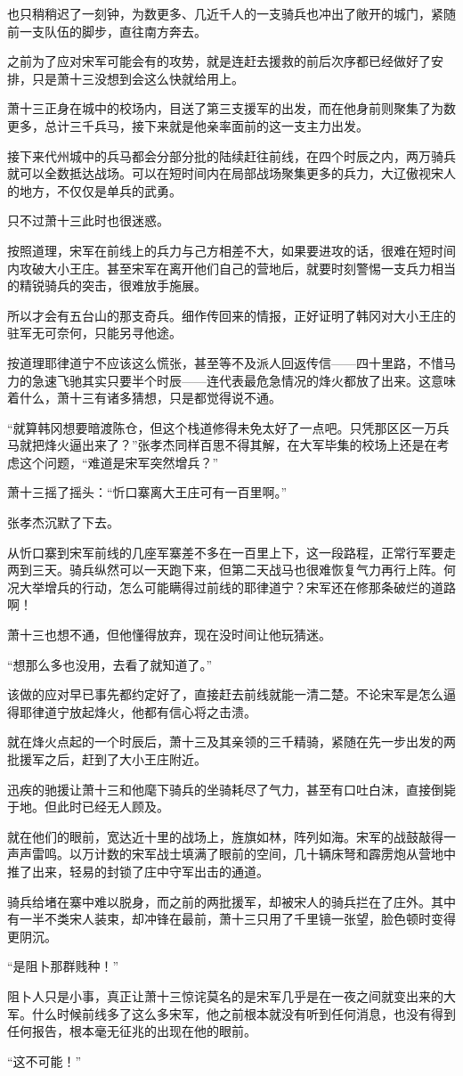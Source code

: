 也只稍稍迟了一刻钟，为数更多、几近千人的一支骑兵也冲出了敞开的城门，紧随前一支队伍的脚步，直往南方奔去。

之前为了应对宋军可能会有的攻势，就是连赶去援救的前后次序都已经做好了安排，只是萧十三没想到会这么快就给用上。

萧十三正身在城中的校场内，目送了第三支援军的出发，而在他身前则聚集了为数更多，总计三千兵马，接下来就是他亲率面前的这一支主力出发。

接下来代州城中的兵马都会分部分批的陆续赶往前线，在四个时辰之内，两万骑兵就可以全数抵达战场。可以在短时间内在局部战场聚集更多的兵力，大辽傲视宋人的地方，不仅仅是单兵的武勇。

只不过萧十三此时也很迷惑。

按照道理，宋军在前线上的兵力与己方相差不大，如果要进攻的话，很难在短时间内攻破大小王庄。甚至宋军在离开他们自己的营地后，就要时刻警惕一支兵力相当的精锐骑兵的突击，很难放手施展。

所以才会有五台山的那支奇兵。细作传回来的情报，正好证明了韩冈对大小王庄的驻军无可奈何，只能另寻他途。

按道理耶律道宁不应该这么慌张，甚至等不及派人回返传信——四十里路，不惜马力的急速飞驰其实只要半个时辰——连代表最危急情况的烽火都放了出来。这意味着什么，萧十三有诸多猜想，只是都觉得说不通。

“就算韩冈想要暗渡陈仓，但这个栈道修得未免太好了一点吧。只凭那区区一万兵马就把烽火逼出来了？”张孝杰同样百思不得其解，在大军毕集的校场上还是在考虑这个问题，“难道是宋军突然增兵？”

萧十三摇了摇头：“忻口寨离大王庄可有一百里啊。”

张孝杰沉默了下去。

从忻口寨到宋军前线的几座军寨差不多在一百里上下，这一段路程，正常行军要走两到三天。骑兵纵然可以一天跑下来，但第二天战马也很难恢复气力再行上阵。何况大举增兵的行动，怎么可能瞒得过前线的耶律道宁？宋军还在修那条破烂的道路啊！

萧十三也想不通，但他懂得放弃，现在没时间让他玩猜迷。

“想那么多也没用，去看了就知道了。”

该做的应对早已事先都约定好了，直接赶去前线就能一清二楚。不论宋军是怎么逼得耶律道宁放起烽火，他都有信心将之击溃。

就在烽火点起的一个时辰后，萧十三及其亲领的三千精骑，紧随在先一步出发的两批援军之后，赶到了大小王庄附近。

迅疾的驰援让萧十三和他麾下骑兵的坐骑耗尽了气力，甚至有口吐白沫，直接倒毙于地。但此时已经无人顾及。

就在他们的眼前，宽达近十里的战场上，旌旗如林，阵列如海。宋军的战鼓敲得一声声雷鸣。以万计数的宋军战士填满了眼前的空间，几十辆床弩和霹雳炮从营地中推了出来，轻易的封锁了庄中守军出击的通道。

骑兵给堵在寨中难以脱身，而之前的两批援军，却被宋人的骑兵拦在了庄外。其中有一半不类宋人装束，却冲锋在最前，萧十三只用了千里镜一张望，脸色顿时变得更阴沉。

“是阻卜那群贱种！”

阻卜人只是小事，真正让萧十三惊诧莫名的是宋军几乎是在一夜之间就变出来的大军。什么时候前线多了这么多宋军，他之前根本就没有听到任何消息，也没有得到任何报告，根本毫无征兆的出现在他的眼前。

“这不可能！”